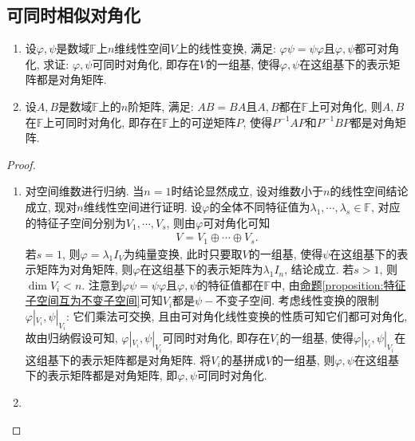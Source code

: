 \documentclass[../../main.tex]{subfiles}%
\begin{document}
\subsection{可同时相似对角化}

\begin{proposition}\label{proposition:乘法可交换诱导同时对角化}
\begin{enumerate}
\item 设\(\varphi,\psi\)是数域\(\mathbb{F}\)上\(n\)维线性空间\(V\)上的线性变换, 满足: \(\varphi\psi = \psi\varphi\)且\(\varphi,\psi\)都可对角化, 求证: \(\varphi,\psi\)可同时对角化, 即存在\(V\)的一组基, 使得\(\varphi,\psi\)在这组基下的表示矩阵都是对角矩阵.

\item 设\(A,B\)是数域\(\mathbb{F}\)上的\(n\)阶矩阵, 满足: \(AB = BA\)且\(A,B\)都在\(\mathbb{F}\)上可对角化, 则\(A,B\)在\(\mathbb{F}\)上可同时对角化, 即存在\(\mathbb{F}\)上的可逆矩阵\(P\), 使得\(P^{-1}AP\)和\(P^{-1}BP\)都是对角矩阵.
\end{enumerate}
\end{proposition}
\begin{proof}
\begin{enumerate}
\item 对空间维数进行归纳. 当\(n = 1\)时结论显然成立, 设对维数小于\(n\)的线性空间结论成立, 现对\(n\)维线性空间进行证明. 设\(\varphi\)的全体不同特征值为\(\lambda_{1},\cdots ,\lambda_{s} \in \mathbb{F}\), 对应的特征子空间分别为\(V_{1},\cdots ,V_{s}\), 则由\(\varphi\)可对角化可知
\begin{align*}
V = V_{1}\oplus\cdots\oplus V_{s}.
\end{align*}
若\(s = 1\), 则\(\varphi=\lambda_{1}I_{V}\)为纯量变换, 此时只要取\(V\)的一组基, 使得\(\psi\)在这组基下的表示矩阵为对角矩阵, 则\(\varphi\)在这组基下的表示矩阵为\(\lambda_{1}I_{n}\), 结论成立. 若\(s > 1\), 则\(\dim V_{i}< n\). 注意到\(\varphi\psi = \psi\varphi\)且\(\varphi,\psi\)的特征值都在\(\mathbb{F}\)中, 由\hyperref[proposition:特征子空间互为不变子空间]{命题\ref{proposition:特征子空间互为不变子空间}}可知\(V_{i}\)都是\(\psi -\)不变子空间. 考虑线性变换的限制\(\varphi|_{V_{i}},\psi|_{V_{i}}\): 它们乘法可交换, 且由可对角化线性变换的性质可知它们都可对角化, 故由归纳假设可知, \(\varphi|_{V_{i}},\psi|_{V_{i}}\)可同时对角化, 即存在\(V_{i}\)的一组基, 使得\(\varphi|_{V_{i}},\psi|_{V_{i}}\)在这组基下的表示矩阵都是对角矩阵. 将\(V_{i}\)的基拼成\(V\)的一组基, 则\(\varphi,\psi\)在这组基下的表示矩阵都是对角矩阵, 即\(\varphi,\psi\)可同时对角化.

\item 
\end{enumerate}
\end{proof}
\end{document}
